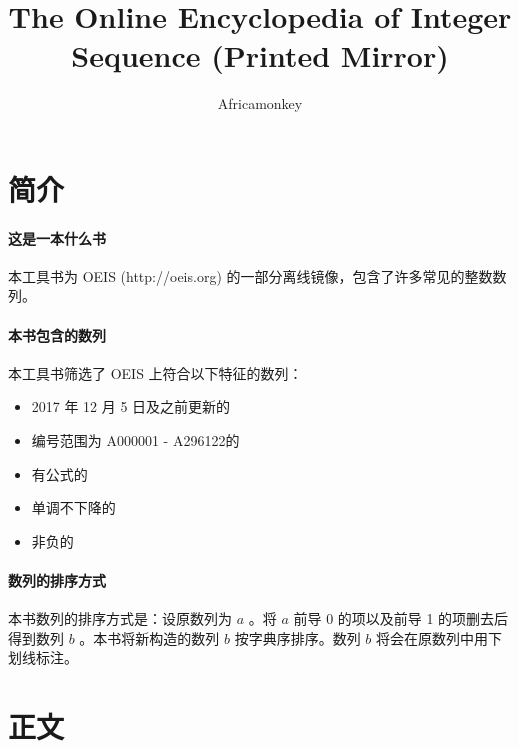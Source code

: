 \documentclass[a4paper]{article}
\begin{document}
\title{The Online Encyclopedia of Integer Sequence (Printed Mirror)}
\author {Africamonkey}

\twocolumn

\section{简介}

\paragraph{这是一本什么书}

本工具书为 OEIS (http://oeis.org) 的一部分离线镜像，包含了许多常见的整数数列。

\paragraph{本书包含的数列}

本工具书筛选了 OEIS 上符合以下特征的数列：

\begin{itemize}
\item 2017 年 12 月 5 日及之前更新的
\item 编号范围为 A000001 - A296122的
\item 有公式的
\item 单调不下降的
\item 非负的
\end{itemize}

\paragraph{数列的排序方式}

本书数列的排序方式是：设原数列为 $a$ 。将 $a$ 前导 0 的项以及前导 1 的项删去后得到数列 $b$ 。本书将新构造的数列 $b$ 按字典序排序。数列 $b$ 将会在原数列中用下划线标注。

\section{正文}

\footnotesize


\end{document}
